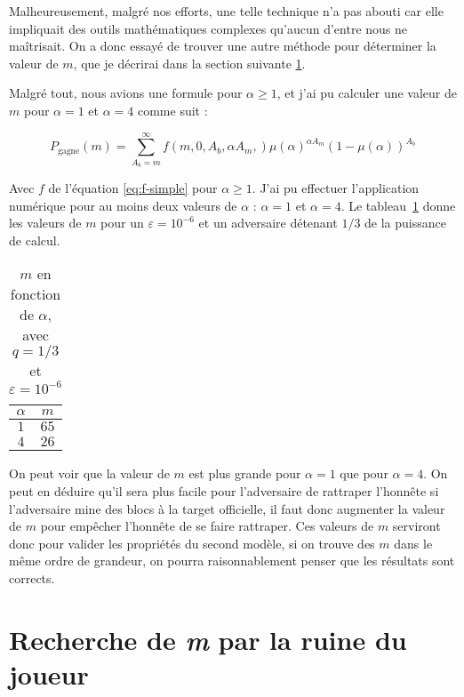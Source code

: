 	Malheureusement, malgré nos efforts, une telle technique n'a pas abouti car
	elle impliquait des outils mathématiques complexes qu'aucun d'entre nous ne
	maîtrisait. On a donc essayé de trouver une autre méthode pour déterminer la
	valeur de $m$, que je décrirai dans la section suivante
	\ref{sec:recherche-m-gamblers-ruin}.

	Malgré tout, nous avions une formule pour $\alpha \geq 1$, et j'ai pu calculer
	une valeur de $m$ pour $\alpha = 1$ et $\alpha = 4$ comme suit :

	\begin{equation}
		P_{\text{gagne}}(m) = 
			\sum_{A_b=m}^{\infty} 
				f(m,0,A_b,\alpha A_m,) 
				\mu(\alpha)^{\alpha A_m}
				(1-\mu(\alpha))^{A_b}
	\end{equation}
	
	Avec $f$ de l'équation \ref{eq:f-simple} pour $\alpha \geq 1$. J'ai pu 
	effectuer l'application numérique pour au moins deux valeurs de $\alpha$ :
	$\alpha = 1$ et $\alpha = 4$. Le tableau~\ref{tab:m_alpha} donne les valeurs
	de $m$ pour un $\varepsilon = 10^{-6}$ et un adversaire détenant $1/3$ de la
	puissance de calcul.
	
	\begin{table}[h]
		\centering
		\begin{tabular}{|c||c|}
			\hline
			$\alpha$ & $m$ \\
			\hline
			$1$ & $65$ \\
			$4$ & $26$ \\
			\hline
		\end{tabular}
		\caption{$m$ en fonction de $\alpha$, avec $q = 1/3$ et $\varepsilon =
		10^{-6}$}
		\label{tab:m_alpha}
	\end{table}

	On peut voir que la valeur de $m$ est plus grande pour $\alpha = 1$ que pour
	$\alpha = 4$. On peut en déduire qu'il sera plus facile pour l'adversaire de
	rattraper l'honnête si l'adversaire mine des blocs à la target officielle, il
	faut donc augmenter la valeur de $m$ pour empêcher l'honnête de se faire
	rattraper. Ces valeurs de $m$ serviront donc pour valider les propriétés du
	second modèle, si on trouve des $m$ dans le même ordre de grandeur, on pourra
	raisonnablement penser que les résultats sont corrects.
	

\section{Recherche de \textit{m} par la ruine du joueur}
\label{sec:recherche-m-gamblers-ruin}

